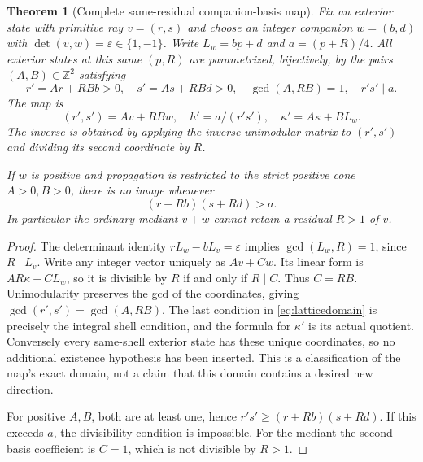 \documentclass[11pt]{article}
\newtheorem{theorem}{Theorem}[section]
\theoremstyle{remark}\newtheorem{remark}[theorem]{Remark}
\newcommand{\Z}{\mathbb Z}
\begin{document}
\begin{theorem}[Complete same-residual companion-basis map]\label{thm:lattice}
Fix an exterior state with primitive ray $v=(r,s)$ and choose an integer companion $w=(b,d)$ with $\det(v,w)=\varepsilon\in\{1,-1\}$. Write $L_w=bp+d$ and $a=(p+R)/4$. All exterior states at this same $(p,R)$ are parametrized, bijectively, by the pairs $(A,B)\in\Z^2$ satisfying
\begin{equation}\label{eq:latticedomain}
 r'=Ar+RBb>0,\quad s'=As+RBd>0,\quad
 \gcd(A,RB)=1,\quad r's'\mid a.
\end{equation}
The map is
\begin{equation}\label{eq:latticemap}
 (r',s')=Av+RBw,\quad h'=a/(r's'),\quad
 \kappa'=A\kappa+B L_w.
\end{equation}
The inverse is obtained by applying the inverse unimodular matrix to $(r',s')$ and dividing its second coordinate by $R$.

If $w$ is positive and propagation is restricted to the strict positive cone $A>0,B>0$, there is no image whenever
\begin{equation}\label{eq:heightbarrier}
 (r+Rb)(s+Rd)>a.
\end{equation}
In particular the ordinary mediant $v+w$ cannot retain a residual $R>1$ of $v$.
\end{theorem}
\begin{proof}
The determinant identity $rL_w-bL_v=\varepsilon$ implies $\gcd(L_w,R)=1$, since $R\mid L_v$. Write any integer vector uniquely as $Av+Cw$. Its linear form is $AR\kappa+C L_w$, so it is divisible by $R$ if and only if $R\mid C$. Thus $C=RB$. Unimodularity preserves the gcd of the coordinates, giving $\gcd(r',s')=\gcd(A,RB)$. The last condition in \eqref{eq:latticedomain} is precisely the integral shell condition, and the formula for $\kappa'$ is its actual quotient. Conversely every same-shell exterior state has these unique coordinates, so no additional existence hypothesis has been inserted. This is a classification of the map's exact domain, not a claim that this domain contains a desired new direction.

For positive $A,B$, both are at least one, hence $r's'\ge(r+Rb)(s+Rd)$. If this exceeds $a$, the divisibility condition is impossible. For the mediant the second basis coefficient is $C=1$, which is not divisible by $R>1$.
\end{proof}
\end{document}
